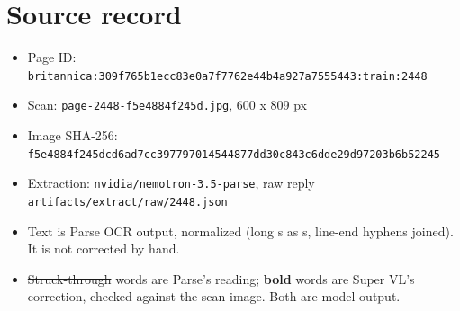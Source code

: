 \documentclass[10pt]{article}
\begin{document}
\section*{Source record}
\begin{itemize}
\item Page ID: \texttt{britannica:309f765b1ecc83e0a7f7762e44b4a927a7555443:train:2448}
\item Scan: \texttt{page-2448-f5e4884f245d.jpg}, 600 x 809 px
\item Image SHA-256: \texttt{\small f5e4884f245dcd6ad7cc397797014544877dd30c843c6dde29d97203b6b52245}
\item Extraction: \texttt{nvidia/nemotron-3.5-parse}, raw reply \texttt{artifacts/extract/raw/2448.json}
\item Text is Parse OCR output, normalized (long s as s, line-end hyphens joined). It is not corrected by hand.
\item \sout{Struck-through} words are Parse's reading; \textbf{bold} words are Super VL's correction, checked against the scan image. Both are model output.
\end{itemize}
\end{document}
